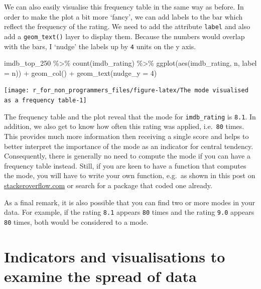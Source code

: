 \documentclass[
]{book}
\newenvironment{Shaded}{\begin{snugshade}}{\end{snugshade}}
\newcommand{\AttributeTok}[1]{\textcolor[rgb]{0.77,0.63,0.00}{#1}}
\newcommand{\DecValTok}[1]{\textcolor[rgb]{0.00,0.00,0.81}{#1}}
\newcommand{\FunctionTok}[1]{\textcolor[rgb]{0.00,0.00,0.00}{#1}}
\newcommand{\NormalTok}[1]{#1}
\newcommand{\SpecialCharTok}[1]{\textcolor[rgb]{0.00,0.00,0.00}{#1}}
\begin{document}
We can also easily visualise this frequency table in the same way as before. In order to make the plot a bit more `fancy', we can add labels to the bar which reflect the frequency of the rating. We need to add the attribute \texttt{label} and also add a \texttt{geom\_text()} layer to display them. Because the numbers would overlap with the bars, I `nudge' the labels up by \texttt{4} units on the y axis.

\begin{Shaded}
\begin{Highlighting}[]
\NormalTok{imdb\_top\_250 }\SpecialCharTok{\%\textgreater{}\%} 
  \FunctionTok{count}\NormalTok{(imdb\_rating) }\SpecialCharTok{\%\textgreater{}\%} 
  \FunctionTok{ggplot}\NormalTok{(}\FunctionTok{aes}\NormalTok{(imdb\_rating, n, }\AttributeTok{label =}\NormalTok{ n)) }\SpecialCharTok{+}
  \FunctionTok{geom\_col}\NormalTok{() }\SpecialCharTok{+}
  \FunctionTok{geom\_text}\NormalTok{(}\AttributeTok{nudge\_y =} \DecValTok{4}\NormalTok{)}
\end{Highlighting}
\end{Shaded}

\begin{center}\texttt{[image: r\_for\_non\_programmers\_files/figure-latex/The mode visualised as a frequency table-1]} \end{center}

The frequency table and the plot reveal that the mode for \texttt{imdb\_rating} is \texttt{8.1}. In addition, we also get to know how often this rating was applied, i.e.~\texttt{80} times. This provides much more information then receiving a single score and helps to better interpret the importance of the mode as an indicator for central tendency. Consequently, there is generally no need to compute the mode if you can have a frequency table instead. Still, if you are keen to have a function that computes the mode, you will have to write your own function, e.g.~as shown in this post on \href{https://stackoverflow.com/questions/2547402/how-to-find-the-statistical-mode}{stackeroverflow.com} or search for a package that coded one already.

As a final remark, it is also possible that you can find two or more modes in your data. For example, if the rating \texttt{8.1} appears \texttt{80} times and the rating \texttt{9.0} appears \texttt{80} times, both would be considered to a mode.

\hypertarget{spread-of-data}{%
\section{Indicators and visualisations to examine the spread of data}\label{spread-of-data}}
\end{document}
